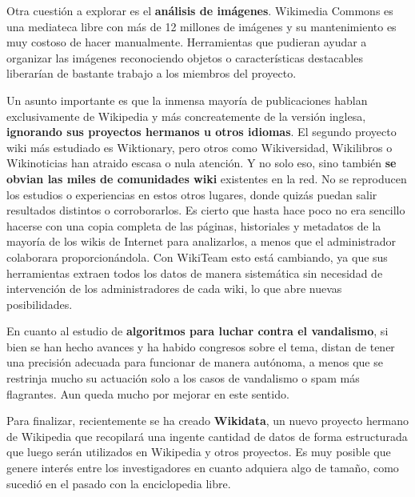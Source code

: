 \documentclass[11pt,onecolumn]{article}
\begin{document}

Otra cuestión a explorar es el \textbf{análisis de imágenes}. Wikimedia Commons es una mediateca libre con más de 12 millones de imágenes y su mantenimiento es muy costoso de hacer manualmente. Herramientas que pudieran ayudar a organizar las imágenes reconociendo objetos o características destacables liberarían de bastante trabajo a los miembros del proyecto.


Un asunto importante es que la inmensa mayoría de publicaciones hablan exclusivamente de Wikipedia y más concreatemente de la versión inglesa, \textbf{ignorando sus proyectos hermanos u otros idiomas}. El segundo proyecto wiki más estudiado es Wiktionary, pero otros como Wikiversidad, Wikilibros o Wikinoticias han atraido escasa o nula atención. Y no solo eso, sino también \textbf{se obvian las miles de comunidades wiki} existentes en la red. No se reproducen los estudios o experiencias en estos otros lugares, donde quizás puedan salir resultados distintos o corroborarlos. Es cierto que hasta hace poco no era sencillo hacerse con una copia completa de las páginas, historiales y metadatos de la mayoría de los wikis de Internet para analizarlos, a menos que el administrador colaborara proporcionándola. Con WikiTeam esto está cambiando, ya que sus herramientas extraen todos los datos de manera sistemática sin necesidad de intervención de los administradores de cada wiki, lo que abre nuevas posibilidades.

En cuanto al estudio de \textbf{algoritmos para luchar contra el vandalismo}, si bien se han hecho avances y ha habido congresos sobre el tema, distan de tener una precisión adecuada para funcionar de manera autónoma, a menos que se restrinja mucho su actuación solo a los casos de vandalismo o spam más flagrantes. Aun queda mucho por mejorar en este sentido.

Para finalizar, recientemente se ha creado \textbf{Wikidata}, un nuevo proyecto hermano de Wikipedia que recopilará una ingente cantidad de datos de forma estructurada que luego serán utilizados en Wikipedia y otros proyectos. Es muy posible que genere interés entre los investigadores en cuanto adquiera algo de tamaño, como sucedió en el pasado con la enciclopedia libre.
\end{document}
